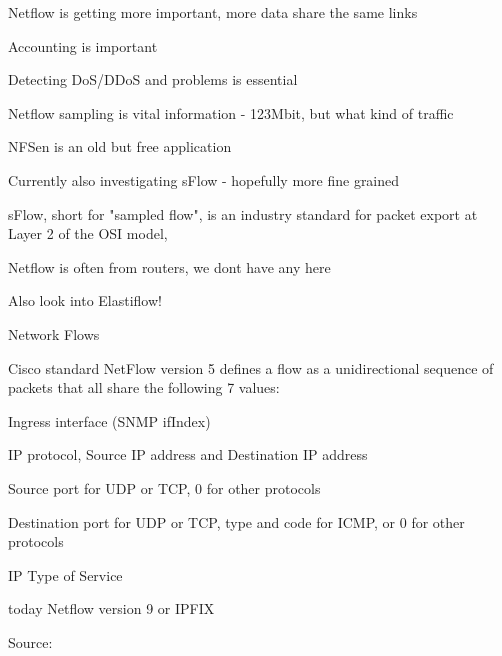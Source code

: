\documentclass[Screen16to9,17pt]{foils}
\begin{document}
\begin{list2}
\item Netflow is getting more important, more data share the same links
\item Accounting is important
\item Detecting DoS/DDoS and problems is essential
\item Netflow sampling is vital information - 123Mbit, but what kind of traffic
\item NFSen is an old but free application
\item Currently also investigating sFlow - hopefully more fine grained
\item sFlow, short for "sampled flow", is an industry standard for packet export at Layer 2 of the OSI model, \\
\end{list2}

\centerline{Netflow is often from routers, we dont have any here}

Also look into Elastiflow! 




\begin{list1}
\item Network Flows
\item Cisco standard NetFlow version 5 defines a flow as a unidirectional sequence of packets that all share the following 7 values:
\begin{list2}
\item Ingress interface (SNMP ifIndex)
\item IP protocol, Source IP address and Destination IP address
\item Source port for UDP or TCP, 0 for other protocols
\item Destination port for UDP or TCP, type and code for ICMP, or 0 for other protocols
\item IP Type of Service
\end{list2}
\item today Netflow version 9 or IPFIX
\end{list1}

Source: \\{\footnotesize
{}\\
}
\end{document}

